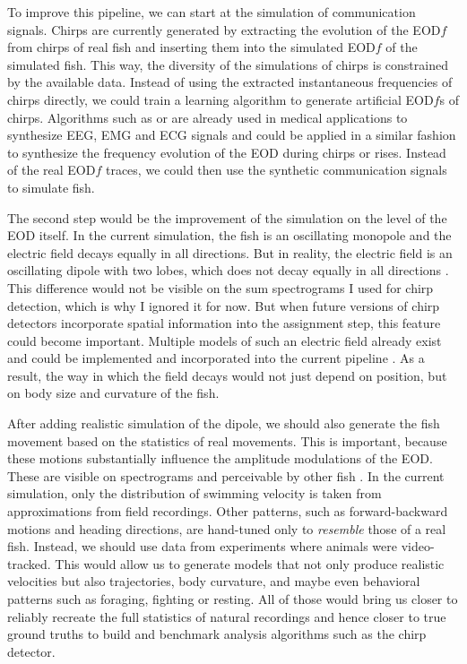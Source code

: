 To improve this pipeline, we can start at the simulation of communication
signals. Chirps are currently generated by extracting the evolution of the
EOD$f$ from chirps of real fish and inserting them into the simulated EOD$f$ of
the simulated fish. This way, the diversity of the simulations of chirps is
constrained by the available data. Instead of using the extracted instantaneous
frequencies of chirps directly, we could train a learning
algorithm to generate artificial EOD$f$s of chirps. Algorithms such as
 \parencite{nishikimiVariationalAutoencoderBased2024} or
 \parencite{dissanayakeGeneralizedGenerativeDeep2023,
hazraSynSigGANGenerativeAdversarial2020} are already used in medical
applications to synthesize EEG, EMG and ECG signals and could be applied in a
similar fashion to synthesize the frequency evolution of the EOD during chirps
or rises. Instead of the real EOD$f$ traces, we could then use the synthetic
communication signals to simulate fish.

The second step would be the improvement of the simulation on the level of the
EOD itself. In the current simulation, the fish is an oscillating monopole and
the electric field decays equally in all directions. But in reality, the
electric field is an oscillating dipole with two lobes, which does not decay
equally in all directions \parencite{bendaPhysicsElectrosensoryWorlds2020}.
This difference would not be visible on the sum spectrograms I used for chirp
detection, which is why I ignored it for now. But when future versions of chirp
detectors incorporate spatial information into the assignment step, this
feature could become important. Multiple models of such an electric field
already exist and could be implemented and incorporated into the current
pipeline \parencite{babineauModelingElectricField2006,
nelsonPreyCaptureWeakly1999, wallachInternalModelCanceling2023}. As a result,
the way in which the field decays would not just depend on position, but on
body size and curvature of the fish.

After adding realistic simulation of the dipole, we should also generate the
fish movement based on the statistics of real movements. This is
important, because these motions substantially influence the amplitude
modulations of the EOD. These are visible on spectrograms and perceivable by
other fish \parencite{yuElectrosensoryContrastSignals2019,
fotowatStatisticsElectrosensoryInput2013a}. In the current simulation, only the
distribution of swimming velocity is taken from approximations from field
recordings. Other patterns, such as forward-backward motions and heading
directions, are hand-tuned only to \emph{resemble} those of a real fish.
Instead, we should use data from experiments where animals were video-tracked.
This would allow us to generate models that not only produce realistic
velocities but also trajectories, body curvature, and maybe even behavioral
patterns such as foraging, fighting or resting. All of those would bring us
closer to reliably recreate the full statistics of natural recordings and hence
closer to true ground truths to build and benchmark analysis algorithms such as
the chirp detector.

